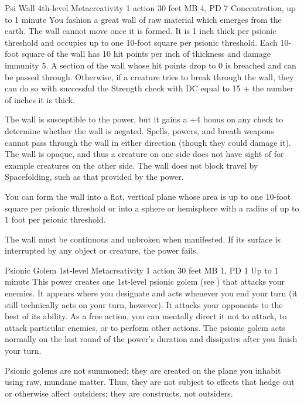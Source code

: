 \DndPowerHeader%
  {Psi Wall}
  {4th-level Metacreativity}
  {1 action}
  {30 feet}
  {MB 4, PD 7}
  {Concentration, up to 1 minute}
You fashion a great wall of raw material which emerges from the earth.
The wall cannot move once it is formed.
It is 1 inch thick per psionic threshold
and occupies up to one 10-foot square per psionic threshold.
Each 10-foot square of the wall has 10 hit points per inch of thickness
and damage immunity 5.
A section of the wall whose hit points drop to 0 is breached
and can be passed through.
Otherwise, if a creature tries to break through the wall,
they can do so with successful the Strength check with
DC equal to 15 + the number of inches it is thick.

The wall is susceptible to the  power,
but it gains a +4 bonus on any check
to determine whether the wall is negated.
Spells, powers, and breath weapons cannot pass through the wall
in either direction
(though they could damage it).
The wall is opaque, and thus a creature on one side does not have
sight of for example creatures on the other side.
The wall does not block travel by Spacefolding,
such as that provided by the  power.
  
You can form the wall into a flat, vertical plane
whose area is up to one 10-foot square per psionic threshold
or into a sphere or hemisphere
with a radius of up to 1 foot per psionic threshold.
  
The wall must be continuous and unbroken when manifested.
If its surface is interrupted by any object or creature,
the power fails.

\DndPowerHeader%
  {Psionic Golem}
  {1st-level Metacreativity}
  {1 action}
  {30 feet}
  {MB 1, PD 1}
  {Up to 1 minute}
  This power creates one 1st-level psionic golem
  (see )
  that attacks your enemies.
  It appears where you designate and acts
  whenever you end your turn
  (it still technically acts on your turn, however).
  It attacks your opponents to the best of its ability.
  As a free action,
  you can mentally direct it not to attack,
  to attack particular enemies,
  or to perform other actions.
  The psionic golem acts normally on the last round
  of the power's duration
  and dissipates after you finish your turn.

  Psionic golems are not summoned;
  they are created on the plane you inhabit
  using raw, mundane matter.
  Thus, they are not subject to effects
  that hedge out or otherwise affect outsiders;
  they are constructs, not outsiders.

